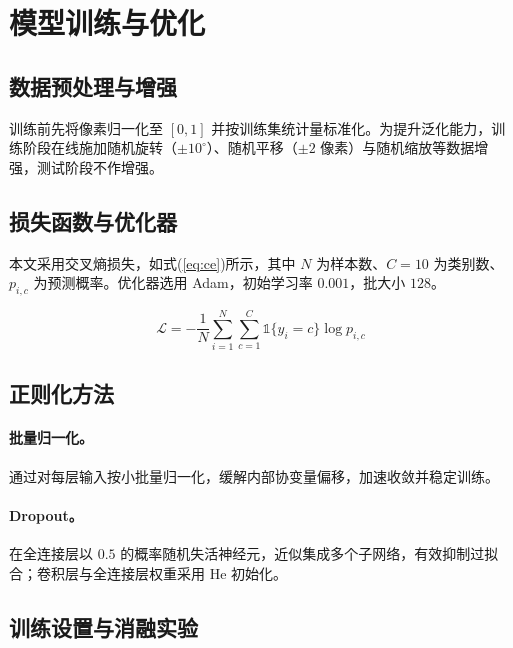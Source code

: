 \section{模型训练与优化}

\subsection{数据预处理与增强}

训练前先将像素归一化至 $[0,1]$ 并按训练集统计量标准化。为提升泛化能力，训练阶段在线施加随机旋转（$\pm10^{\circ}$）、随机平移（$\pm2$ 像素）与随机缩放等数据增强\cite{krizhevsky2012imagenet}，测试阶段不作增强。

\subsection{损失函数与优化器}

本文采用交叉熵损失，如式(\ref{eq:ce})所示，其中 $N$ 为样本数、$C=10$ 为类别数、$p_{i,c}$ 为预测概率。优化器选用 Adam\cite{kingma2015adam}，初始学习率 $0.001$，批大小 $128$。

\begin{equation}
\mathcal{L} = -\frac{1}{N}\sum_{i=1}^{N}\sum_{c=1}^{C} \mathbb{1}\{y_i = c\}\log p_{i,c}
\label{eq:ce}
\end{equation}

\subsection{正则化方法}

\paragraph{批量归一化。}通过对每层输入按小批量归一化\cite{ioffe2015batch}，缓解内部协变量偏移，加速收敛并稳定训练。

\paragraph{Dropout。}在全连接层以 $0.5$ 的概率随机失活神经元\cite{srivastava2014dropout}，近似集成多个子网络，有效抑制过拟合；卷积层与全连接层权重采用 He 初始化\cite{glorot2010understanding}。

\subsection{训练设置与消融实验}

